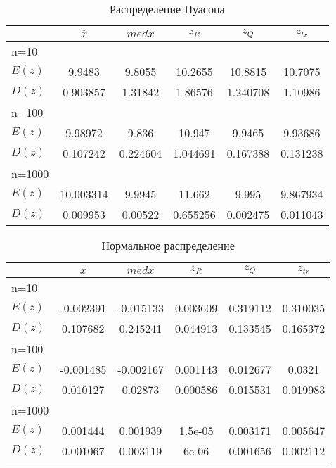 \documentclass[../main.tex]{subfiles}
\begin{document}
	\begin{table}[H]
    \centering
    \begin{tabular}{|l||c|c|c|c|c|}
        \hline
        & $\overline{x}$ & $med x$ & $z_R$ & $z_Q$ & $z_{tr}$\\\hline\hline
        n=10 & & & & &\\\hline
        $E(z)$ & 9.9483 & 9.8055 & 10.2655 & 10.8815 & 10.7075\\\hline
        $D(z)$ & 0.903857 & 1.31842 & 1.86576 & 1.240708 & 1.10986\\\hline
        n=100 & & & & &\\\hline
        $E(z)$ & 9.98972 & 9.836 & 10.947 & 9.9465 & 9.93686\\\hline
        $D(z)$ & 0.107242 & 0.224604 & 1.044691 & 0.167388 & 0.131238\\\hline
        n=1000 & & & & &\\\hline
        $E(z)$ & 10.003314 & 9.9945 & 11.662 & 9.995 & 9.867934\\\hline
        $D(z)$ & 0.009953 & 0.00522 & 0.655256 & 0.002475 & 0.011043\\\hline
    \end{tabular}
    \caption{Распределение Пуасона}
    \label{tab:normal}
    \end{table}
    
    \begin{table}[H]
    \centering
    \begin{tabular}{|l||c|c|c|c|c|}
        \hline
        & $\overline{x}$ & $med x$ & $z_R$ & $z_Q$ & $z_{tr}$\\\hline\hline
        n=10 & & & & &\\\hline
        $E(z)$ & -0.002391 & -0.015133 & 0.003609 & 0.319112 & 0.310035\\\hline
        $D(z)$ & 0.107682 & 0.245241 & 0.044913 & 0.133545 & 0.165372\\\hline
        n=100 & & & & &\\\hline
        $E(z)$ & -0.001485 & -0.002167 & 0.001143 & 0.012677 & 0.0321\\\hline
        $D(z)$ & 0.010127 & 0.02873 & 0.000586 & 0.015531 & 0.019983\\\hline
        n=1000 & & & & &\\\hline
        $E(z)$ & 0.001444 & 0.001939 & 1.5e-05 & 0.003171 & 0.005647\\\hline
        $D(z)$ & 0.001067 & 0.003119 & 6e-06 & 0.001656 & 0.002112\\\hline
    \end{tabular}
    \caption{Нормальное распределение}
    \label{tab:normal}
    \end{table}
	
\end{document}
